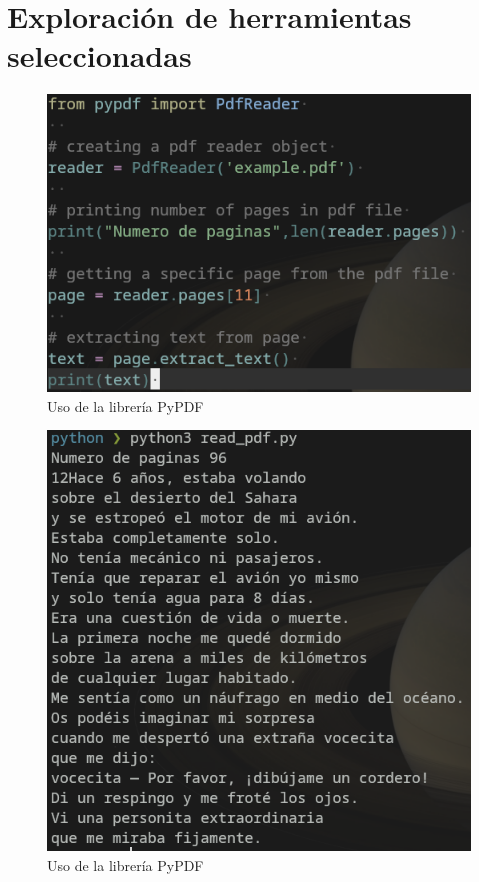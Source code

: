 \documentclass[journal,onecolumn]{IEEEtran}
\begin{document}
	\section{Exploración de herramientas seleccionadas}
	\begin{figure}[H]
		\centering
		\includegraphics[scale=0.5]{pypdf_1}
		\caption{Uso de la librería PyPDF}
		\small
	\end{figure}
		\begin{figure}[H]
		\centering
		\includegraphics[scale=0.5]{pypdf_2}
		\caption{Uso de la librería PyPDF}
		\small
	\end{figure}
\end{document}
